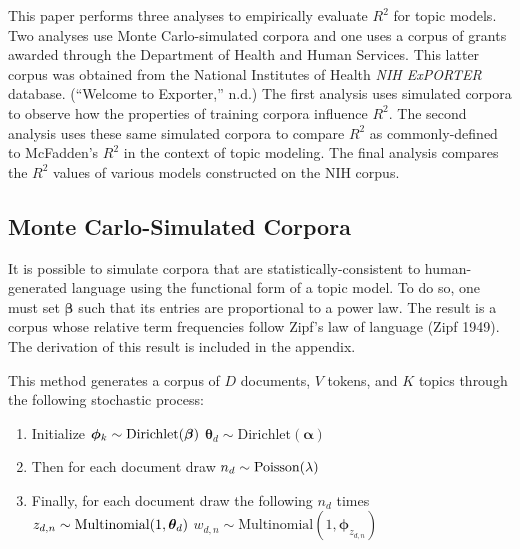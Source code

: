 \documentclass[conference,final,]{IEEEtran}
\providecommand{\tightlist}{%
  \setlength{\itemsep}{0pt}\setlength{\parskip}{0pt}}
\begin{document}
This paper performs three analyses to empirically evaluate \(R^2\) for
topic models. Two analyses use Monte Carlo-simulated corpora and one
uses a corpus of grants awarded through the Department of Health and
Human Services. This latter corpus was obtained from the National
Institutes of Health \emph{NIH ExPORTER} database. (``Welcome to
Exporter,'' n.d.) The first analysis uses simulated corpora to observe
how the properties of training corpora influence \(R^2\). The second
analysis uses these same simulated corpora to compare \(R^2\) as
commonly-defined to McFadden's \(R^2\) in the context of topic modeling.
The final analysis compares the \(R^2\) values of various models
constructed on the NIH corpus.

\hypertarget{monte-carlo-simulated-corpora}{%
\subsection{Monte Carlo-Simulated
Corpora}\label{monte-carlo-simulated-corpora}}

It is possible to simulate corpora that are statistically-consistent to
human-generated language using the functional form of a topic model. To
do so, one must set \(\boldsymbol\beta\) such that its entries are
proportional to a power law. The result is a corpus whose relative term
frequencies follow Zipf's law of language (Zipf 1949). The derivation of
this result is included in the appendix.

This method generates a corpus of \(D\) documents, \(V\) tokens, and
\(K\) topics through the following stochastic process:

\begin{enumerate}
\def\labelenumi{\arabic{enumi}.}
\tightlist
\item
  Initialize
  \(\\ \boldsymbol\phi_k \sim \text{Dirichlet}(\boldsymbol\beta)\\\)
  \(\boldsymbol\theta_d \sim \text{Dirichlet}(\boldsymbol\alpha)\)
\item
  Then for each document draw \(\\ n_d \sim \text{Poisson}(\lambda)\)
\item
  Finally, for each document draw the following \(n_d\) times
  \(\\ z_{d,n} \sim \text{Multinomial}(1, \boldsymbol\theta_d)\\\)
  \(w_{d,n} \sim \text{Multinomial}(1, \boldsymbol\phi_{z_{d,n}})\)
\end{enumerate}
\end{document}
